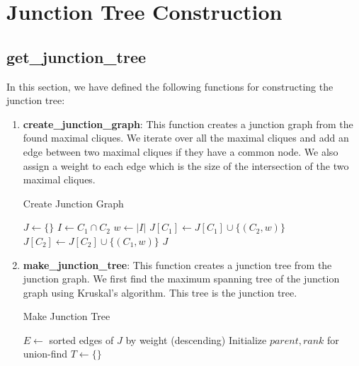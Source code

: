 \documentclass[12pt]{article}
\begin{document}
\newpage

\section{Junction Tree Construction}

\subsection{get\_junction\_tree}
In this section, we have defined the following functions for constructing the junction tree:

\begin{enumerate}
    \item \textbf{create\_junction\_graph}: This function creates a junction graph from the found maximal cliques. We iterate over all the maximal cliques and add an edge between two maximal cliques if they have a common node. We also assign a weight to each edge which is the size of the intersection of the two maximal cliques.
    
    \begin{algorithm}
        \caption{Create Junction Graph}
        \begin{algorithmic}[1]
            \State $J \gets \{\}$
                \State $I \gets C_1 \cap C_2$
                    \State $w \gets |I|$
                    \State $J[C_1] \gets J[C_1] \cup \{(C_2, w)\}$
                    \State $J[C_2] \gets J[C_2] \cup \{(C_1, w)\}$
                \EndIf
            \EndFor
            \State \Return $J$
        \EndFunction
        \end{algorithmic}
    \end{algorithm}        
    
    \item \textbf{make\_junction\_tree}: This function creates a junction tree from the junction graph. We first find the maximum spanning tree of the junction graph using Kruskal's algorithm. This tree is the junction tree.
    
    \begin{algorithm}
        \caption{Make Junction Tree}
        \begin{algorithmic}[1]
            \State $E \gets$ sorted edges of $J$ by weight (descending)
            \State Initialize $parent, rank$ for union-find
            \State $T \gets \{\}$
        

\end{algorithmic}
\end{algorithm}
\end{enumerate}
\end{document}
